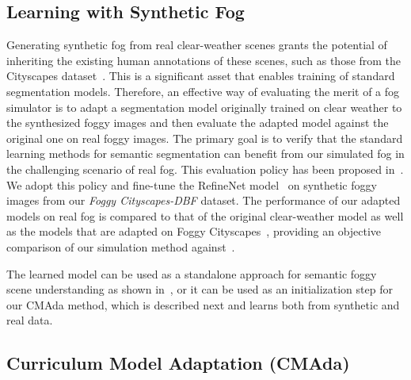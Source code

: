 \documentclass[twocolumn]{svjour3}          \smartqed  \usepackage{graphicx}
\begin{document}
\subsection{Learning with Synthetic Fog}
\label{sec:learning:syn}
Generating synthetic fog from real clear-weather scenes grants the potential of inheriting the existing human annotations of these scenes, such as those from the Cityscapes dataset~\cite{Cityscapes}. This is a significant asset that enables training of standard segmentation models. Therefore, an effective way of evaluating the merit of a fog simulator is to adapt a segmentation model originally trained on clear weather to the synthesized foggy images and then evaluate the adapted model against the original one on real foggy images. The primary goal is to verify that the standard learning methods for semantic segmentation can benefit from our simulated fog in the challenging scenario of real fog. This evaluation policy has been proposed in~\cite{SFSU_synthetic}. We adopt this policy and fine-tune the RefineNet model~\cite{refinenet} on synthetic foggy images from our \emph{Foggy Cityscapes-DBF} dataset. The performance of our adapted models on real fog is compared to that of the original clear-weather model as well as the models that are adapted on Foggy Cityscapes~\cite{SFSU_synthetic}, providing an objective comparison of our simulation method against~\cite{SFSU_synthetic}.

The learned model can be used as a standalone approach for semantic foggy scene understanding as shown in~\cite{SFSU_synthetic}, or it can be used as an initialization step for our CMAda method, which is described next and learns both from synthetic and real data. 

\subsection{Curriculum Model Adaptation (CMAda)}
\end{document}
